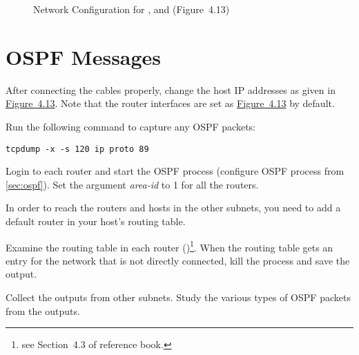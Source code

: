 \documentclass{../UTNetLab}
\begin{document}
\begin{figure}[H]
        \caption{Network Configuration for ,  and  (Figure~4.13)}\label{fig:4.13}
    \end{figure}

\section{OSPF Messages}
    After connecting the cables properly, change the host IP addresses as given in \hyperref[fig:4.13]{Figure~4.13}.
    Note that the router interfaces are set as \hyperref[fig:4.13]{Figure~4.13} by default.

    Run the following command to capture any OSPF packets: 
    \begin{lstlisting}[morekeywords={[3]ip,proto}]
tcpdump -x -s 120 ip proto 89
    \end{lstlisting}

    Login to each router and start the OSPF process (configure OSPF process from \autoref{sec:ospf}).
    Set the argument \textit{area-id} to 1 for all the routers.

    In order to reach the routers and hosts in the other subnets, you need to add a default router in your host’s routing table.

    Examine the routing table in each router ()\footnote{see Section~4.3 of reference book.}.
    When the routing table gets an entry for the network that is not directly connected, kill the  process and save the  output.

    Collect the  outputs from other subnets.
    Study the various types of OSPF packets from the  outputs.
    
\end{document}
